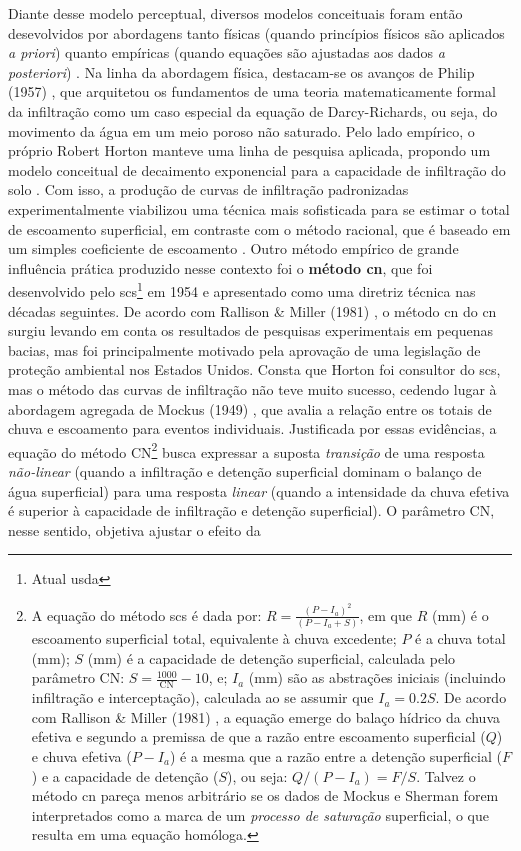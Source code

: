 \documentclass[./main.tex]{subfiles}
\begin{document}
\par Diante desse modelo perceptual, diversos modelos conceituais foram então desevolvidos por abordagens tanto físicas (quando princípios físicos são aplicados \textit{a priori}) quanto empíricas (quando equações são ajustadas aos dados \textit{a posteriori})  \cite{mishra2003}. Na linha da abordagem física, destacam-se os avanços de Philip (1957) \cite{philip1957}, que arquitetou os fundamentos de uma teoria matematicamente formal da infiltração como um caso especial da equação de Darcy-Richards, ou seja, do movimento da água em um meio poroso não saturado. Pelo lado empírico, o próprio Robert Horton manteve uma linha de pesquisa aplicada, propondo um modelo conceitual de decaimento exponencial para a capacidade de infiltração do solo \cite{Horton1939}. Com isso, a produção de curvas de infiltração padronizadas experimentalmente viabilizou uma técnica mais sofisticada para se estimar o total de escoamento superficial, em contraste com o método racional, que é baseado em um simples coeficiente de escoamento \cite{Cook1946}. Outro método empírico de grande influência prática produzido nesse contexto foi o \textbf{método \acrfull{cn}}, que foi desenvolvido pelo \acrfull{scs}\footnote{Atual \acrfull{usda}} em 1954 e apresentado como uma diretriz técnica nas décadas seguintes. De acordo com Rallison \& Miller (1981) \cite{Rallison1981}, o método \acrshort{cn} do \acrshort{cn} surgiu levando em conta os resultados de pesquisas experimentais em pequenas bacias, mas foi principalmente motivado pela aprovação de uma legislação de proteção ambiental nos Estados Unidos. Consta que Horton foi consultor do \acrshort{scs}, mas o método das curvas de infiltração não teve muito sucesso, cedendo lugar à abordagem agregada de Mockus (1949) \cite{mockus1949}, que avalia a relação entre os totais de chuva e escoamento para eventos individuais. Justificada por essas evidências, a equação do método CN\footnote{A equação do método \acrshort{scs} é dada por: $R = \frac{(P - I_a)^{2}}{(P - I_a + S)}$, em que $R$ (mm) é o escoamento superficial total, equivalente à chuva excedente; $P$ é a chuva total (mm); $S$ (mm) é a capacidade de detenção superficial, calculada pelo parâmetro CN: $S = \frac{1000}{\text{CN}}-10$, e; $I_a$ (mm) são as abstrações iniciais (incluindo infiltração e interceptação), calculada ao se assumir que $I_a = 0.2S$. De acordo com Rallison \& Miller (1981) \cite{Rallison1981}, a equação emerge do balaço hídrico da chuva efetiva e segundo a premissa de que a razão entre escoamento superficial ($Q$) e chuva efetiva ($P - I_a$) é a mesma que a razão entre a detenção superficial ($F$) e a capacidade de detenção ($S$), ou seja: $Q/(P-I_a) = F/S$. Talvez o método \acrshort{cn} pareça menos arbitrário se os dados de Mockus e Sherman forem interpretados como a marca de um \textit{processo de saturação} superficial, o que resulta em uma equação homóloga.} busca expressar a suposta \textit{transição} de uma resposta \textit{não-linear} (quando a infiltração e detenção superficial dominam o balanço de água superficial) para uma resposta \textit{linear} (quando a intensidade da chuva efetiva é superior à capacidade de infiltração e detenção superficial). O parâmetro CN, nesse sentido, objetiva ajustar o efeito da 
\end{document}
